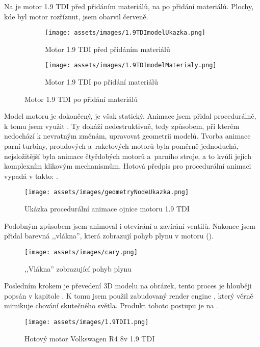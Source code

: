 \newpage
{Na  je motor 1.9 TDI před přidáním materiálů, na  po přidání materiálů. Plochy, kde byl motor rozříznut, jsem obarvil červeně.}
\begin{figure}[H]
    \centering
    \begingroup
    \makeatletter
    \renewcommand\thesubfigure{\thefigure~--~\@nameuse{subfiglabel@\alph{subfigure}}}
    \newcommand{\subfiglabel@a}{vlevo}
    \newcommand{\subfiglabel@b}{vpravo}
    \captionsetup[subfigure]{labelformat=simple, labelsep=colon}
    \renewcommand\p@subfigure{}
    \makeatother
    \begin{subfigure}[t]{.45\textwidth}
        \centering
        \texttt{[image: assets/images/1.9TDImodelUkazka.png]}
        \caption{Motor 1.9 TDI před přidáním materiálů \jaObr}
        \label{obr:predMaterialy}
    \end{subfigure}
    \hfill
    \begin{subfigure}[t]{.45\textwidth}
        \centering
        \texttt{[image: assets/images/1.9TDImodelMaterialy.png]}
        \caption{Motor 1.9 TDI po přidání materiálů \jaObr}
        \label{obr:poMaterialy}
    \end{subfigure}
    \endgroup
\end{figure}
{Model motoru je dokončený, je však statický. Animace jsem přidal procedurálně, k tomu jsem využit . Ty dokáží nedestruktivně, tedy způsobem, při kterém nedochází k nevratným změnám, upravovat geometrii modelů. Tvorba animace parní turbíny, proudových a~raketových motorů byla poměrně jednoduchá, nejsložitější byla animace čtyřdobých motorů a~parního stroje, a to kvůli jejich komplexním klikovým mechanismům.}\odst
{Hotová předpis pro procedurální animaci vypadá v  takto: .}
\begin{figure}[H]
    \centering
    \texttt{[image: assets/images/geometryNodeUkazka.png]}
    \caption{Ukázka procedurální animace ojnice motoru 1.9 TDI \jaObr}
    \label{obr:geometryNodeUkazka}
\end{figure}
\newpage
{Podobným způsobem jsem animoval i otevírání a zavírání ventilů. Nakonec jsem přidal barevná ,,vlákna'', která zobrazují pohyb plynu v motoru ().}
\begin{figure}[H]
    \centering
    \texttt{[image: assets/images/cary.png]}
    \caption{,,Vlákna'' zobrazující pohyb plynu \jaObr}
    \label{obr:1.9TDICary}
\end{figure}
{Posledním krokem je převedení 3D modelu na obrázek, tento proces je hlouběji popsán v kapitole . K tomu jsem použil zabudovaný render engine , který věrně mimikuje chování skutečného světla. Produkt tohoto postupu je na .}
\begin{figure}[H]
    \centering
    \texttt{[image: assets/images/1.9TDI1.png]}
    \caption{Hotový motor Volkswagen R4 8v 1.9 TDI \jaObr}
    \label{obr:1.9TDIUkazkaHotovo}
\end{figure}
\newpage
